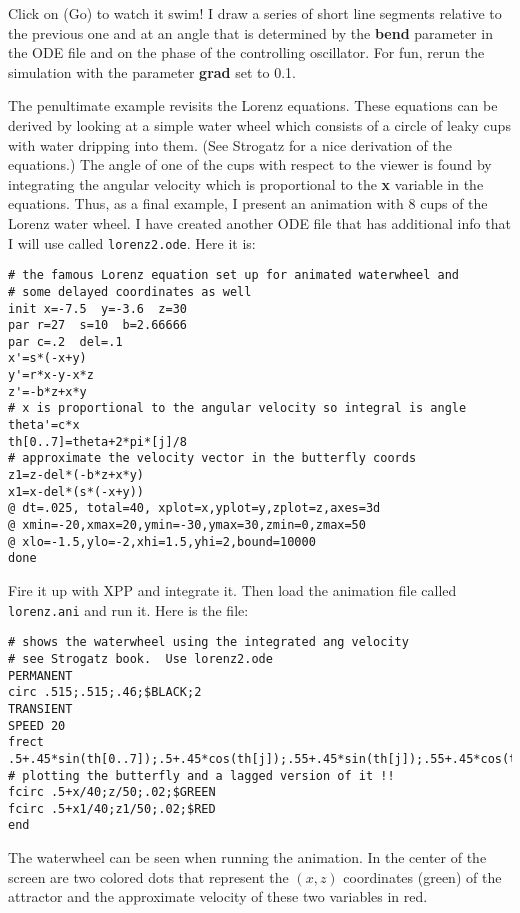 \documentclass{article}
\begin{document}
Click on (Go) to watch it swim! I draw a series of short
line segments relative to the previous one and at an angle that is
determined by the {\bf bend} parameter in the ODE file and on the
phase of the controlling oscillator. For fun, rerun the simulation
with the parameter {\bf grad} set to 0.1.

\medskip

The penultimate example revisits the Lorenz equations. These equations can
be derived by looking at a simple water wheel which consists of a
circle of leaky cups with water dripping into them. (See Strogatz for
a nice derivation of the equations.) The angle of one of the cups with
respect to the viewer is found by integrating the angular velocity
which is proportional to the {\bf x} variable in the equations. Thus,
as a final example, I present an animation with 8 cups of the Lorenz
water wheel.  I have created another ODE file that has additional info
that I will use called {\tt lorenz2.ode}.  Here it is:
\begin{verbatim}
# the famous Lorenz equation set up for animated waterwheel and
# some delayed coordinates as well
init x=-7.5  y=-3.6  z=30
par r=27  s=10  b=2.66666
par c=.2  del=.1
x'=s*(-x+y)
y'=r*x-y-x*z
z'=-b*z+x*y
# x is proportional to the angular velocity so integral is angle
theta'=c*x
th[0..7]=theta+2*pi*[j]/8
# approximate the velocity vector in the butterfly coords
z1=z-del*(-b*z+x*y)
x1=x-del*(s*(-x+y))
@ dt=.025, total=40, xplot=x,yplot=y,zplot=z,axes=3d
@ xmin=-20,xmax=20,ymin=-30,ymax=30,zmin=0,zmax=50
@ xlo=-1.5,ylo=-2,xhi=1.5,yhi=2,bound=10000
done
\end{verbatim}

Fire it up with XPP and integrate it.  Then load the animation file
called {\tt lorenz.ani} and run it. Here is the file:
\begin{verbatim}
# shows the waterwheel using the integrated ang velocity
# see Strogatz book.  Use lorenz2.ode
PERMANENT
circ .515;.515;.46;$BLACK;2
TRANSIENT
SPEED 20
frect .5+.45*sin(th[0..7]);.5+.45*cos(th[j]);.55+.45*sin(th[j]);.55+.45*cos(th[j]);$BLACK
# plotting the butterfly and a lagged version of it !!
fcirc .5+x/40;z/50;.02;$GREEN
fcirc .5+x1/40;z1/50;.02;$RED
end
\end{verbatim}

The waterwheel can be seen when running the animation. In the center
of the screen are two colored dots that represent the $(x,z)$
coordinates (green) of the attractor and the approximate velocity of
these two variables in red.
\end{document}

